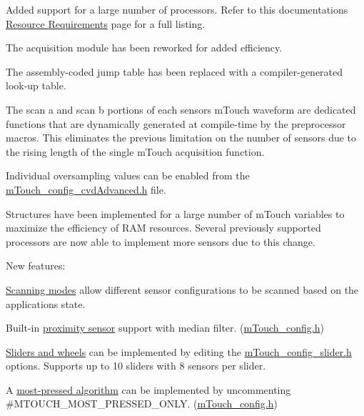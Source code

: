 \begin{DoxyItemize}
\item Added support for a large number of processors. Refer to this documentations \textquotesingle{}\hyperlink{_resource_requirements_PICSupport}{Resource Requirements}\textquotesingle{} page for a full listing. \item The acquisition module has been reworked for added efficiency. 
\begin{DoxyItemize}
\item The assembly-\/coded jump table has been replaced with a compiler-\/generated look-\/up table. 
\item The \textquotesingle{}scan a\textquotesingle{} and \textquotesingle{}scan b\textquotesingle{} portions of each sensor\textquotesingle{}s m\+Touch waveform are dedicated functions that are dynamically generated at compile-\/time by the preprocessor macros. This eliminates the previous limitation on the number of sensors due to the rising length of the single m\+Touch acquisition function. 
\item Individual oversampling values can be enabled from the \hyperlink{m_touch__config__cvd_advanced_8h}{m\+Touch\+\_\+config\+\_\+cvd\+Advanced.\+h} file. 
\end{DoxyItemize}\item Structures have been implemented for a large number of m\+Touch variables to maximize the efficiency of R\+A\+M resources. Several previously supported processors are now able to implement more sensors due to this change. \item New features\+: 
\begin{DoxyItemize}
\item \hyperlink{featMode}{Scanning modes} allow different sensor configurations to be scanned based on the application\textquotesingle{}s state. 
\item Built-\/in \hyperlink{featProximity}{proximity sensor} support with median filter. (\hyperlink{m_touch__config_8h}{m\+Touch\+\_\+config.\+h}) 
\item \hyperlink{featSliders}{Sliders and wheels} can be implemented by editing the \hyperlink{m_touch__config__slider_8h}{m\+Touch\+\_\+config\+\_\+slider.\+h} options. Supports up to 10 sliders with 8 sensors per slider. 
\item A \hyperlink{featMostPressed}{most-\/pressed algorithm} can be implemented by uncommenting \#\+M\+T\+O\+U\+C\+H\+\_\+\+M\+O\+S\+T\+\_\+\+P\+R\+E\+S\+S\+E\+D\+\_\+\+O\+N\+L\+Y. (\hyperlink{m_touch__config_8h}{m\+Touch\+\_\+config.\+h}) 

\end{DoxyItemize}
\end{DoxyItemize}
